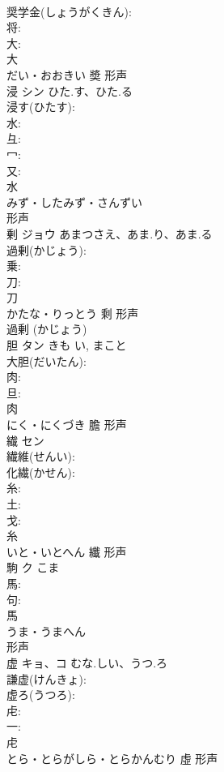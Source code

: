 \documentclass[8pt]{extreport}
\begin{document}
\begin{CJK}{UTF8}{min}
\\	奨学金(しょうがくきん): 
\\	将: 
\\	大: 
\\	大	
\\	だい・おおきい	奬	形声 
\\	浸	シン	ひた.す、ひた.る		
\\	浸す(ひたす): 
\\	水: 
\\	彑: 
\\	冖: 
\\	又: 
\\	水	
\\	みず・したみず・さんずい	
\\	形声 
\\	剰	ジョウ	あまつさえ、あま.り、あま.る		
\\	過剰(かじょう): 
\\	乗: 
\\	刀: 
\\	刀	
\\	かたな・りっとう	剩	形声 
\\	過剰 (かじょう) 
\\	胆	タン	きも	い, まこと	
\\	大胆(だいたん): 
\\	肉: 
\\	旦: 
\\	肉	
\\	にく・にくづき	膽	形声 
\\	繊	セン			
\\	繊維(せんい): 
\\	化繊(かせん): 
\\	糸: 
\\	土: 
\\	戈: 
\\	糸	
\\	いと・いとへん	纖	形声 
\\	駒	ク	こま		
\\	馬: 
\\	句: 
\\	馬	
\\	うま・うまへん	
\\	形声 
\\	虚	キョ、コ	むな.しい、うつ.ろ		
\\	謙虚(けんきょ): 
\\	虚ろ(うつろ): 
\\	虍: 
\\	一: 
\\	虍	
\\	とら・とらがしら・とらかんむり	虛	形声 

\end{CJK}
\end{document}
